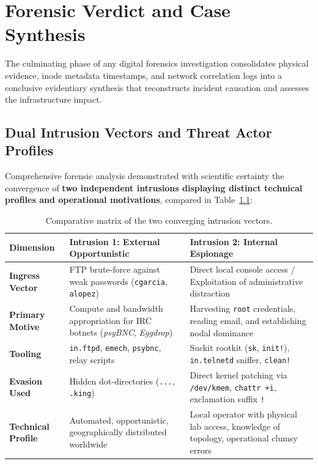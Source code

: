 \chapter{Forensic Verdict and Case Synthesis}
\label{cap:veredicto_y_atribucion}

The culminating phase of any digital forensics investigation consolidates physical evidence, inode metadata timestamps, and network correlation logs into a conclusive evidentiary synthesis that reconstructs incident causation and assesses the infrastructure impact.

\section{Dual Intrusion Vectors and Threat Actor Profiles}

Comprehensive forensic analysis demonstrated with scientific certainty the convergence of \textbf{two independent intrusions displaying distinct technical profiles and operational motivations}, compared in Table~\ref{tab:comparativa_intrusiones}:

\begin{table}[htbp]
\centering
\small
\begin{tabularx}{\textwidth}{@{} l X X @{}}
\toprule
\textbf{Dimension} & \textbf{Intrusion 1: External Opportunistic} & \textbf{Intrusion 2: Internal Espionage} \\
\midrule
\textbf{Ingress Vector} & FTP brute-force against weak passwords (\texttt{cgarcia}, \texttt{alopez}) & Direct local console access / Exploitation of administrative distraction \\
\addlinespace
\textbf{Primary Motive} & Compute and bandwidth appropriation for IRC botnets (\textit{psyBNC}, \textit{Eggdrop}) & Harvesting \texttt{root} credentials, reading email, and establishing nodal dominance \\
\addlinespace
\textbf{Tooling} & \texttt{in.ftpd}, \texttt{emech}, \texttt{psybnc}, relay scripts & Suckit rootkit (\texttt{sk}, \texttt{init!}), \texttt{in.telnetd} sniffer, \texttt{clean!} \\
\addlinespace
\textbf{Evasion Used} & Hidden dot-directories (\texttt{...}, \texttt{.king}) & Direct kernel patching via \texttt{/dev/kmem}, \texttt{chattr +i}, exclamation suffix \texttt{!} \\
\addlinespace
\textbf{Technical Profile} & Automated, opportunistic, geographically distributed worldwide & Local operator with physical lab access, knowledge of topology, operational clumsy errors \\
\bottomrule
\end{tabularx}
\caption{Comparative matrix of the two converging intrusion vectors.}
\label{tab:comparativa_intrusiones}
\end{table}

